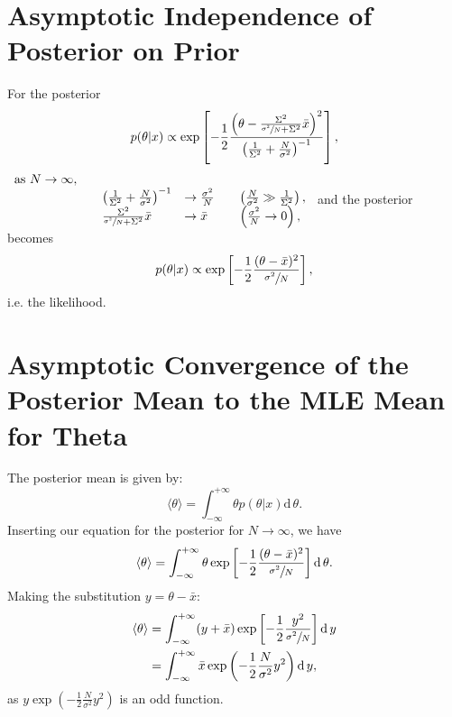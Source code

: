 \documentclass[a4paper,11pt,twoside]{article}
\begin{document}
\section{Asymptotic Independence of Posterior on Prior}
For the posterior
\begin{equation*}
	p(\theta|x) \propto \exp \left[-\frac{1}{2} \frac{ \left( \theta - \frac{\Sigma^2}{\sfrac{\sigma^2}{N} + \Sigma^2} \bar{x} \right)^2}{ \left( \frac{1}{\Sigma^2} + \frac{N}{\sigma^2} \right)^{-1}} \right],
\end{equation*}
$
\begin{array}{l l l l}
	\text{as }N \rightarrow \infty, &\quad 
	\\ &\quad \left( \frac{1}{\Sigma^2} + \frac{N}{\sigma^2} \right)^{-1} &\rightarrow \frac{\sigma^2}{N} \quad &\left(\frac{N}{\sigma^2} \gg \frac{1}{\Sigma^2}\right), 
	\\ &\quad \frac{\Sigma^2}{\sfrac{\sigma^2}{N} + \Sigma^2} \bar{x} &\rightarrow \bar{x} \quad &\left(\frac{\sigma^2}{N} \rightarrow 0\right),
\end{array}
$
and the posterior becomes
\begin{equation*}
	p(\theta|x) \propto \exp \left[-\frac{1}{2} \frac{(\theta - \bar{x})^2}{\sfrac{\sigma^2}{N}} \right], 
\end{equation*}
i.e. the likelihood.

\section{Asymptotic Convergence of the Posterior Mean to the MLE Mean for Theta}
The posterior mean is given by:
\begin{equation*}
	\langle \theta \rangle = \int_{-\infty}^{+\infty} \theta p(\theta|x) \mathrm{d} \, \theta.
\end{equation*}
Inserting our equation for the posterior for $N \rightarrow \infty$, we have
\begin{equation*}
	\langle \theta \rangle = \int_{-\infty}^{+\infty} \theta \exp \left[- \frac{1}{2} \frac{(\theta - \bar{x})^2}{\sfrac{\sigma^2}{N}} \right] \mathrm{d} \, \theta. 
\end{equation*}
Making the substitution $y = \theta - \bar{x}$:
\begin{align*}
	\langle \theta \rangle &= \int_{-\infty}^{+\infty} (y+\bar{x})  \exp \left[- \frac{1}{2} \frac{y^2}{\sfrac{\sigma^2}{N}} \right] \mathrm{d} \, y
	\\ &= \int_{-\infty}^{+\infty} \bar{x} \exp \left(- \frac{1}{2}\frac{N}{\sigma^2} y^2 \right) \mathrm{d} \, y,
\end{align*}
as $ y \exp \left(- \frac{1}{2}\frac{N}{\sigma^2} y^2 \right) $ is an odd function.
\end{document}
